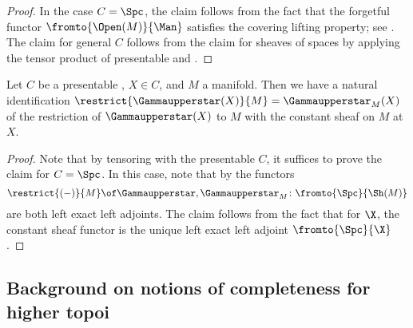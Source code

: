 \begin{proof}
	In the case $ C = \Spc $, the claim follows from the fact that the forgetful functor $ \fromto{\Open(M)}{\Man} $ satisfies the covering lifting property; see \cites[Proposition 7.1]{ClausenMathew:hyperdescent}[Proposition A.12]{arXiv:1803.01804}.
	The claim for general $ C $ follows from the claim for sheaves of spaces by applying the tensor product of presentable \categories and \cite[Lemma 1.18]{arXiv:2108.03545}.
\end{proof}

\begin{corollary}\label{cor:restrictionofconstantsheaf}
	Let $ C $ be a presentable \category, $ X \in C $, and $ M $ a manifold.
	Then we have a natural identification $ \restrict{\Gammaupperstar(X)}{M} = \Gammaupperstar_M(X) $ of the restriction of $ \Gammaupperstar(X) $ to $ M $ with the constant sheaf on $ M $ at $ X $.
\end{corollary}

\begin{proof}
	Note that by tensoring with the presentable \category $ C $, it suffices to prove the claim for $ C = \Spc $.
	In this case, note that by  the functors
	\begin{equation*}
		\restrict{(-)}{M} \of \Gammaupperstar, \Gammaupperstar_M \colon \fromto{\Spc}{\Sh(M)}
	\end{equation*}
	are both left exact left adjoints.
	The claim follows from the fact that for \atopos $ \X $, the constant sheaf functor is the unique left exact left adjoint $ \fromto{\Spc}{\X} $ .
\end{proof}


\subsection{Background on notions of completeness for higher topoi}\label{sec:completeness}

